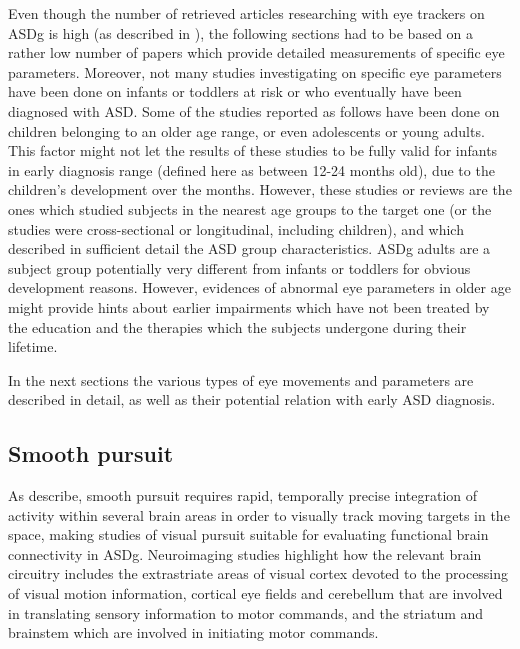 Even though the number of retrieved articles researching with eye trackers on ASDg is high (as described in ), the following sections had to be based on a rather low number of papers which provide detailed measurements of specific eye parameters. Moreover, not many studies investigating on specific eye parameters have been done on infants or toddlers at risk or who eventually have been diagnosed with ASD. Some of the studies reported as follows have been done on children belonging to an older age range, or even adolescents or young adults. This factor might not let the results of these studies to be fully valid for infants in early diagnosis range (defined here as between 12-24 months old), due to the children’s development over the months. However, these studies or reviews are the ones which studied subjects in the nearest age groups to the target one (or the studies were cross-sectional or longitudinal, including children), and which described in sufficient detail the ASD group characteristics. ASDg adults are a subject group potentially very different from infants or toddlers for obvious development reasons. However, evidences of abnormal eye parameters in older age might provide hints about earlier impairments which have not been treated by the education and the therapies which the subjects undergone during their lifetime.

In the next sections the various types of eye movements and parameters are described in detail, as well as their potential relation with early ASD diagnosis.



\subsection{Smooth pursuit}
\label{sec:smoothpursuittheory}

As \cite{takarae2004smoothpursuit} describe, smooth pursuit requires rapid, temporally precise integration of activity within several brain areas in order to visually track moving targets in the space, making studies of visual pursuit suitable for evaluating functional brain connectivity in ASDg. Neuroimaging studies highlight how the relevant brain circuitry includes the extrastriate areas of visual cortex devoted to the processing of visual motion information, cortical eye fields and cerebellum that are involved in translating sensory information to motor commands, and the striatum and brainstem which are involved in initiating motor commands.

